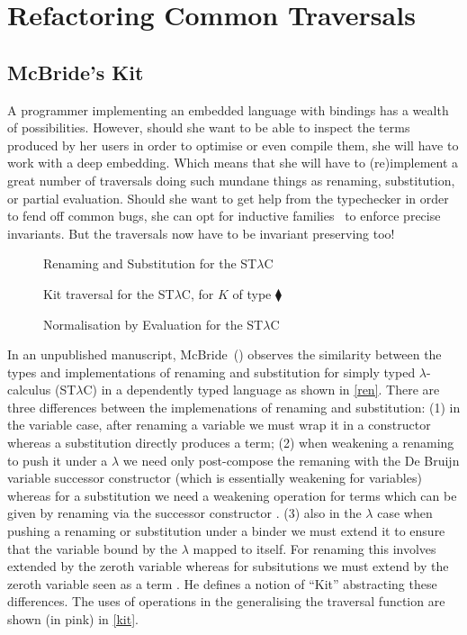 \chapter{Refactoring Common Traversals}

\section{McBride's Kit}

A programmer implementing an embedded language with bindings has a
wealth of possibilities. However, should she want to be able to inspect
the terms produced by her users in order to optimise or even compile
them, she will have to work with a deep embedding. Which means that she
will have to (re)implement a great number of traversals doing such
mundane things as renaming, substitution, or partial evaluation.
Should she want to get help from the typechecker in order to fend
off common bugs, she can opt for inductive families~\cite{dybjer1991inductive}
to enforce precise invariants. But the traversals now have to be
invariant preserving too!

\begin{figure}[h]
\caption{Renaming\label{ren} and Substitution\label{sub} for the ST$λ$C}

\caption{Kit traversal for the ST$λ$C\label{kit}, for $K$ of type  ⧫}

\caption{Normalisation by Evaluation for the ST$λ$C\label{nbe}}
\end{figure}

In an unpublished manuscript, McBride~(\citeyear{mcbride2005type})
observes the similarity between the types and implementations of
renaming and substitution for simply typed $λ$-calculus (ST$λ$C) in a
dependently typed language as shown in \cref{ren}. There are three
differences between the implemenations of renaming and substitution:
(1) in the variable case, after renaming a variable we must wrap it in
a  constructor whereas a substitution directly produces a
term; (2) when weakening a renaming to push it under a $λ$ we need
only post-compose the remaning with the De Bruijn variable successor
constructor  (which is essentially weakening for variables)
whereas for a substitution we need a weakening operation for terms
which can be given by renaming via the successor constructor 
. (3) also in the $λ$ case when pushing a renaming or
substitution under a binder we must extend it to ensure that the
variable bound by the $λ$ mapped to itself. For renaming this involves
extended by the zeroth variable  whereas for subsitutions we
must extend by the zeroth variable seen as a term 
. He defines a notion of ``Kit'' abstracting these
differences.  The uses of  operations in the generalising
the traversal function  are shown (in pink) in \cref{kit}.

